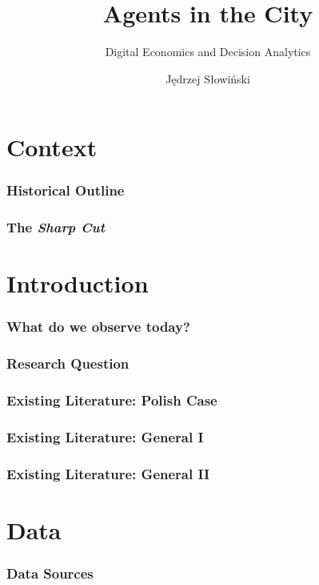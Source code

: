 \documentclass[aspectratio=169]{beamer}
\title{Agents in the City}
\subtitle{Digital Economics and Decision Analytics}
\author{Jędrzej Słowiński}
\institute{Humboldt-Universität zu Berlin \\ Department of Economics}
\date{}
\begin{document}
{
\begin{frame}
    \titlepage
\end{frame}
}

\section*{Context}

\begin{frame}
    \frametitle{Historical Outline}
    
\end{frame}

\graphicspath{ {graphics/} }

\begin{frame}
    \frametitle{The \emph{Sharp Cut}}
    
\end{frame}


\section*{Introduction}
\begin{frame}
    \frametitle{What do we observe today?}
    
\end{frame}

\begin{frame}
    \frametitle{Research Question}
    
\end{frame}

\begin{frame}
    \frametitle{Existing Literature: Polish Case}
    
    
\end{frame}

\begin{frame}
    \frametitle{Existing Literature: General I}
    
\end{frame}

\begin{frame}
    \frametitle{Existing Literature: General II}

\end{frame}

\section*{Data}
\begin{frame}
    \frametitle{Data Sources}
    
\end{frame}
\end{document}
